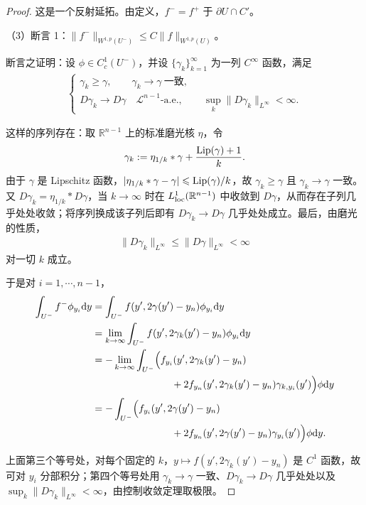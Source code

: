 \documentclass[../../main.tex]{subfiles}%
\begin{document}
\begin{proof}
这是一个反射延拓。由定义，$f^-=f^+$ 于 $\partial U\cap C'$。

（3）断言 1：$\lVert f^-\rVert_{W^{1,p}(U^-)}\leqslant C\lVert f\rVert_{W^{1,p}(U)}$。

断言之证明：设 $\phi\in C_c^1(U^-)$，并设 $\{\gamma_k\}_{k=1}^{\infty}$ 为一列 $C^\infty$ 函数，满足
\begin{align*}
\begin{cases}
\gamma_k\geqslant\gamma,\qquad\gamma_k\to\gamma\ \text{一致},\\
D\gamma_k\to D\gamma\quad\mathcal{L}^{n-1}\text{-a.e.},\qquad\sup_k\lVert D\gamma_k\rVert_{L^\infty}<\infty.
\end{cases}
\end{align*}

这样的序列存在：取 $\mathbb{R}^{n-1}$ 上的标准磨光核 $\eta$，令
\begin{align*}
\gamma_k:=\eta_{1/k}*\gamma+\frac{\operatorname{Lip}(\gamma)+1}{k}.
\end{align*}
由于 $\gamma$ 是 Lipschitz 函数，$\lvert\eta_{1/k}*\gamma-\gamma\rvert\leqslant\operatorname{Lip}(\gamma)/k$，故 $\gamma_k\geqslant\gamma$ 且 $\gamma_k\to\gamma$ 一致。又 $D\gamma_k=\eta_{1/k}*D\gamma$，当 $k\to\infty$ 时在 $L^1_{\mathrm{loc}}(\mathbb{R}^{n-1})$ 中收敛到 $D\gamma$，从而存在子列几乎处处收敛；将序列换成该子列后即有 $D\gamma_k\to D\gamma$ 几乎处处成立。最后，由磨光的性质，
\begin{align*}
\lVert D\gamma_k\rVert_{L^\infty}\leqslant\lVert D\gamma\rVert_{L^\infty}<\infty
\end{align*}
对一切 $k$ 成立。

于是对 $i=1,\cdots,n-1$，
\begin{align*}
\int_{U^-}f^-\phi_{y_i}\mathrm{d} y
&=\int_{U^-}f(y',2\gamma(y')-y_n)\phi_{y_i}\mathrm{d} y\\
&=\lim_{k\to\infty}\int_{U^-}f(y',2\gamma_k(y')-y_n)\phi_{y_i}\mathrm{d} y\\
&=-\lim_{k\to\infty}\int_{U^-}\Bigl(f_{y_i}(y',2\gamma_k(y')-y_n)\\
&\qquad\qquad\qquad\qquad+2f_{y_n}(y',2\gamma_k(y')-y_n)\gamma_{k,y_i}(y')\Bigr)\phi\mathrm{d} y\\
&=-\int_{U^-}\Bigl(f_{y_i}(y',2\gamma(y')-y_n)\\
&\qquad\qquad\qquad\qquad+2f_{y_n}(y',2\gamma(y')-y_n)\gamma_{y_i}(y')\Bigr)\phi\mathrm{d} y.
\end{align*}

上面第三个等号处，对每个固定的 $k$，$y\mapsto f(y',2\gamma_k(y')-y_n)$ 是 $C^1$ 函数，故可对 $y_i$ 分部积分；第四个等号处用 $\gamma_k\to\gamma$ 一致、$D\gamma_k\to D\gamma$ 几乎处处以及 $\sup_k\lVert D\gamma_k\rVert_{L^\infty}<\infty$，由控制收敛定理取极限。


\end{proof}
\end{document}

